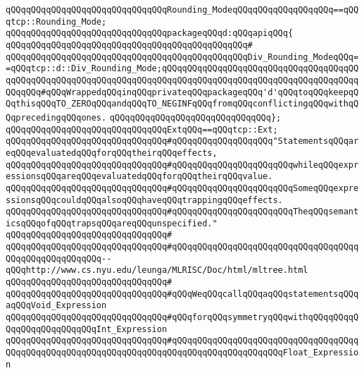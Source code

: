 \newline
\verb|qQQqqQQqqQQqqQQqqQQqqQQqqQQqqQQqRounding_ModeqQQqqQQqqQQqqQQqqQQq==qQQqtcp::Rounding_Mode;|\newline
\newline
\verb|qQQqqQQqqQQqqQQqqQQqqQQqqQQqqQQqpackageqQQqd:qQQqapiqQQq{|\newline
\verb|qQQqqQQqqQQqqQQqqQQqqQQqqQQqqQQqqQQqqQQqqQQqqQQq#|\newline
\verb|qQQqqQQqqQQqqQQqqQQqqQQqqQQqqQQqqQQqqQQqqQQqqQQqDiv_Rounding_ModeqQQq==qQQqtcp::d::Div_Rounding_Mode;qQQqqQQqqQQqqQQqqQQqqQQqqQQqqQQqqQQqqQQqqQQqqQQqqQQqqQQqqQQqqQQqqQQqqQQqqQQqqQQqqQQqqQQqqQQqqQQqqQQqqQQqqQQqqQQqqQQq#qQQqWrappedqQQqinqQQqprivateqQQqpackageqQQq'd'qQQqtoqQQqkeepqQQqthisqQQqTO_ZEROqQQqandqQQqTO_NEGINFqQQqfromqQQqconflictingqQQqwithqQQqprecedingqQQqones.|\newline
\verb|qQQqqQQqqQQqqQQqqQQqqQQqqQQqqQQq};|\newline
\newline
\verb|qQQqqQQqqQQqqQQqqQQqqQQqqQQqqQQqExtqQQq==qQQqtcp::Ext;|\newline
\newline
\verb|qQQqqQQqqQQqqQQqqQQqqQQqqQQqqQQq#qQQqqQQqqQQqqQQqqQQq"StatementsqQQqareqQQqevaluatedqQQqforqQQqtheirqQQqeffects,|\newline
\verb|qQQqqQQqqQQqqQQqqQQqqQQqqQQqqQQq#qQQqqQQqqQQqqQQqqQQqqQQqwhileqQQqexpressionsqQQqareqQQqevaluatedqQQqforqQQqtheirqQQqvalue.|\newline
\verb|qQQqqQQqqQQqqQQqqQQqqQQqqQQqqQQq#qQQqqQQqqQQqqQQqqQQqqQQqSomeqQQqexpressionsqQQqcouldqQQqalsoqQQqhaveqQQqtrappingqQQqeffects.|\newline
\verb|qQQqqQQqqQQqqQQqqQQqqQQqqQQqqQQq#qQQqqQQqqQQqqQQqqQQqqQQqTheqQQqsemanticsqQQqofqQQqtrapsqQQqareqQQqunspecified."|\newline
\verb|qQQqqQQqqQQqqQQqqQQqqQQqqQQqqQQq#|\newline
\verb|qQQqqQQqqQQqqQQqqQQqqQQqqQQqqQQq#qQQqqQQqqQQqqQQqqQQqqQQqqQQqqQQqqQQqqQQqqQQqqQQqqQQqqQQq--qQQqhttp://www.cs.nyu.edu/leunga/MLRISC/Doc/html/mltree.html|\newline
\verb|qQQqqQQqqQQqqQQqqQQqqQQqqQQqqQQq#|\newline
\verb|qQQqqQQqqQQqqQQqqQQqqQQqqQQqqQQq#qQQqWeqQQqcallqQQqaqQQqstatementsqQQqaqQQqVoid_Expression|\newline
\verb|qQQqqQQqqQQqqQQqqQQqqQQqqQQqqQQq#qQQqforqQQqsymmetryqQQqwithqQQqqQQqqQQqqQQqqQQqqQQqqQQqInt_Expression|\newline
\verb|qQQqqQQqqQQqqQQqqQQqqQQqqQQqqQQq#qQQqqQQqqQQqqQQqqQQqqQQqqQQqqQQqqQQqqQQqqQQqqQQqqQQqqQQqqQQqqQQqqQQqqQQqqQQqqQQqqQQqqQQqqQQqFloat_Expression|\newline

